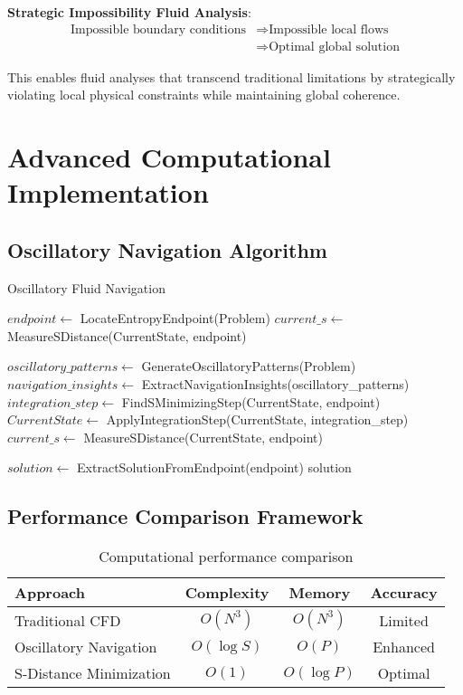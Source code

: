 \documentclass[12pt,a4paper]{article}
\begin{document}
\textbf{Strategic Impossibility Fluid Analysis}:
\begin{align}
\text{Impossible boundary conditions} &\Rightarrow \text{Impossible local flows} \\
&\Rightarrow \text{Optimal global solution}
\end{align}

This enables fluid analyses that transcend traditional limitations by strategically violating local physical constraints while maintaining global coherence.

\section{Advanced Computational Implementation}

\subsection{Oscillatory Navigation Algorithm}

\begin{algorithm}
\caption{Oscillatory Fluid Navigation}
\begin{algorithmic}
    \State $endpoint \gets$ LocateEntropyEndpoint(Problem)
    \State $current\_s \gets$ MeasureSDistance(CurrentState, endpoint)
    
        \State $oscillatory\_patterns \gets$ GenerateOscillatoryPatterns(Problem)
        \State $navigation\_insights \gets$ ExtractNavigationInsights(oscillatory\_patterns)
        \State $integration\_step \gets$ FindSMinimizingStep(CurrentState, endpoint)
        \State $CurrentState \gets$ ApplyIntegrationStep(CurrentState, integration\_step)
        \State $current\_s \gets$ MeasureSDistance(CurrentState, endpoint)
    \EndWhile
    
    \State $solution \gets$ ExtractSolutionFromEndpoint(endpoint)
    \State \Return solution
\EndProcedure
\end{algorithmic}
\end{algorithm}

\subsection{Performance Comparison Framework}

\begin{table}[H]
\centering
\begin{tabular}{lccc}
\toprule
Approach & Complexity & Memory & Accuracy \\
\midrule
Traditional CFD & $O(N^3)$ & $O(N^3)$ & Limited \\
Oscillatory Navigation & $O(\log S)$ & $O(P)$ & Enhanced \\
S-Distance Minimization & $O(1)$ & $O(\log P)$ & Optimal \\
\bottomrule
\end{tabular}
\caption{Computational performance comparison}
\end{table}
\end{document}
